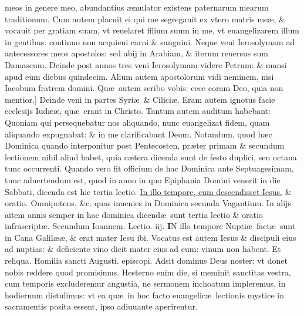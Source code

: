 \documentclass[a5paper,10pt]{book}
\def\leftmarginnote{%
	\lrmarginnote{\hskip -\marginparsep \hskip -6.5em}}
\def\rightmarginnote{%
	\lrmarginnote{\hskip\columnwidth \hskip -1em}}
\def\ae{æ}
\begin{document}
\begin{multicols*}{2}
meos in genere meo, abundantius \ae mulator existens paternarum mearum traditionum.
Cum autem placuit ei qui me segregauit ex vtero matris me\ae , \& vocauit per gratiam suam, vt reuelaret filium suum in me, vt euangelizarem illum in gentibus: continuo non acquieui carni \& sanguini.
Neque veni Ierosolymam ad antecessores meos apostolos: sed abij in Arabiam, \& iterum reuersus sum Damascum. Deinde post annos tres veni Ierosolymam videre Petrum: \& mansi apud eum diebus quindecim. Alium autem apostolorum vidi neminem, nisi Iacobum fratrem domini.
Qu\ae \ autem scribo vobis: ecce coram Deo, quia non mentior.]
Deinde\leftmarginnote{\begin{flushright}C\end{flushright}} veni in partes Syri\ae \ \& Cilici\ae .
Eram autem ignotus facie ecclesijs Iud\ae \ae , qu\ae \ erant in Christo. Tantum autem auditum habebant: Quoniam qui persequebatur nos aliquando, nunc euangelizat fidem, quam aliquando expugnabat: \& in me clarificabant Deum.
\newline {} \color{red} Notandum, quod h\ae c Dominica quando interponitur post Pentecosten, pr\ae ter primam \& secundum lectionem nihil aliud habet, quia c\ae tera dicenda sunt de festo duplici, seu octaua tunc occurrenti. \color{black}
\newline {} \color{red} Quando vero fit officium de hac Dominica ante Septuagesimam, tunc aduertendum est, quod in anno in quo Epiphania Domini venerit in die Sabbati, dicenda est hic tertia lectio. \color{black} \hyperlink{page.172}{In illo tempore, cum descendisset Iesus.} \color{red} \& oratio. \color{black} Omnipotens. \&c. \color{red} quas inuenies in Dominica secunda Vagantium. In alijs aitem annis semper in hac dominica dicend\ae \ sunt tertia lectio \& oratio infrascript\ae . \color{black}
\newline \color{red} Secundum Ioannem. \hfill Lectio. iij. \color{black}
\vspace{-.25em}
\lettrine[lines=2]{\bfseries \color{red} I}{}N\rightmarginnote{ca. 2.} illo tempore Nupti\ae \ fact\ae \ sunt in Cana Galil\ae \ae , \& erat mater Iesu ibi.
Vocatus est autem Iesus \& discipuli eius ad nuptias: \& deficiente vino dicit mater eius ad eum: vinum non habent.
\color{red} Et reliqua. Homilia sancti Augusti. episcopi.\color{black}
\newline \color{red} A\color{black}dsit dominus Deus noster: vt donet nobis reddere quod promisimus.
Hesterno enim die, si meminit sanctitas vestra, cum temporis excluderemur angustia, ne sermonem inchoatum impleremus, in hodiernum distulimus: vt ea qu\ae \ in hoc facto euangelic\ae \ lectionis mystice in sacramentis posita essent, ipso adiuuante aperirentur.

\end{multicols*}
\end{document}
